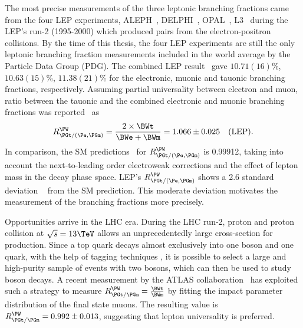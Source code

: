 The most precise measurements of the three \PW leptonic branching fractions came from the four LEP experiments, ALEPH~\cite{Heister:2004wr}, DELPHI~\cite{Abdallah:2003zm}, OPAL~\cite{Abbiendi:2007rs}, L3~\cite{Achard:2004zw} during the LEP's run-2 (1995-2000) which produced \PW\PW pairs from the electron-positron collisions. By the time of this thesis, the four LEP experiments are still the only \PW leptonic branching fraction measurements included in the world average by the Particle Data Group (PDG). The combined LEP result~\cite{Schael:2013ita} gave $10.71(16)\%$, $10.63(15)\%$, $11.38(21)\%$ for the electronic, muonic and tauonic branching fractions, respectively. Assuming partial universality between electron and muon, ratio between the tauonic and the combined electronic and muonic branching fractions was reported~\cite{Schael:2013ita} as
\begin{equation*}
    R^\PW_{\PGt/(\Pe,\PGm)} = \frac{2\times \BWt }{\BWe + \BWm } = 1.066 \pm 0.025 \quad \text{(LEP)}.
\end{equation*}
\noindent In comparison, the SM predictions~\cite{Denner:1991kt,Rtau,dEnterria:2016rbf} for $R^\PW_{\PGt/(\Pe,\PGm)}$ is 0.99912, taking into account the next-to-leading order electroweak corrections and the effect of lepton mass in the \PW decay phase space. LEP's $R^\PW_{\PGt/(\Pe,\PGm)}$ shows a 2.6 standard deviation ~\cite{Schael:2013ita} from the SM prediction. This moderate deviation motivates the measurement of the branching fractions more precisely.



Opportunities arrive in the LHC era. During the LHC run-2, proton and proton collision at $\sqrt{s}=13\TeV$ allows an unprecedentedly large cross-section for \ttbar production. Since a top quark decays almost exclusively into one \PW boson and one \PQb quark, with the help of \PQb tagging techniques \cite{Chatrchyan:2012jua, Sirunyan:2017ezt, Bols:2020bkb}, it is possible to select a large and high-purity sample of \ttbar events with two \PW bosons, which can then be used to study \PW boson decays. A recent measurement by the ATLAS collaboration~\cite{Aad:2020ayz} has exploited such a strategy to measure $R^\PW_{\PGt/\PGm} = \frac{ \BWt}{\BWm}$ by fitting the impact parameter distribution of the final state muons. The resulting value is $R^\PW_{\PGt/\PGm} = 0.992 \pm 0.013$, suggesting that lepton universality is preferred. 



